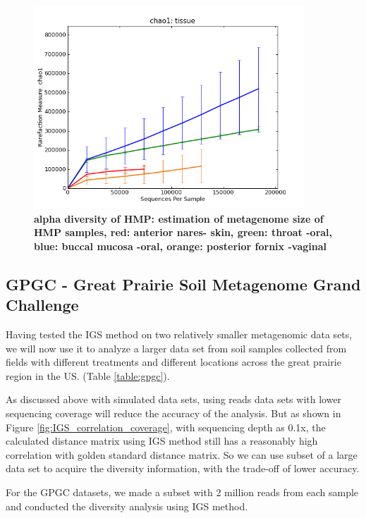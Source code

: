 \begin{figure}[!ht]
 \centerline{\includegraphics[width=4in]{./figures/HMP_alpha.png}}
\caption{\bf alpha diversity of HMP: estimation of metagenome size of HMP samples,
red: anterior nares- skin, green: throat -oral, blue: buccal mucosa -oral, orange: 
posterior fornix -vaginal}
\label{fig:HMP_alpha}
\end{figure}





\subsection{GPGC - Great Prairie Soil Metagenome Grand Challenge}

Having tested the IGS method on two relatively smaller metagenomic data sets, 
we will now use it to analyze 
a larger data set from soil samples collected from fields with different treatments and
different locations across the great prairie region in the US. 
(Table \ref{table:gpgc}). 



As discussed above with simulated data sets, using reads data sets with lower sequencing coverage will reduce
the accuracy of the analysis. But as shown in Figure \ref{fig:IGS_correlation_coverage}, with sequencing depth
as 0.1x, the calculated distance matrix using IGS method still has a reasonably high correlation with golden standard
distance matrix. So we can use subset of a large data set to acquire the diversity information, with the trade-off of
lower accuracy. 

For the GPGC datasets, we made a subset with 2 million reads from each sample 
and conducted the diversity analysis
using IGS method. 

